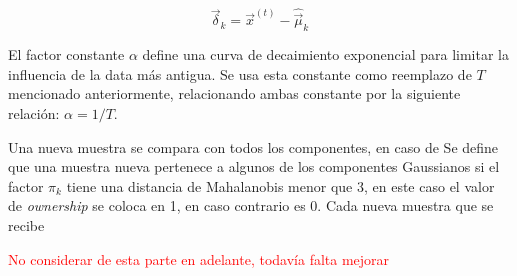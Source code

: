 \[
\vec{\delta}_k = \vec{x}^{(t)} - \hat{\vec{\mu}}_k
\]


El factor constante $\alpha$ define una curva de decaimiento exponencial para limitar la influencia de la data más antigua. Se usa esta constante como reemplazo de $T$ mencionado anteriormente, relacionando ambas constante por la siguiente relación: $\alpha=1/T$. 

Una nueva muestra se compara con todos los componentes, en caso de 
Se define que una muestra nueva pertenece a algunos de los componentes Gaussianos si el factor $\pi_k$ tiene una distancia de Mahalanobis menor que 3, en este caso el valor de \textit{ownership} se coloca en 1, en caso contrario es 0. Cada nueva muestra que se recibe 


\textcolor{red}{No considerar de esta parte en adelante, todavía falta mejorar}

